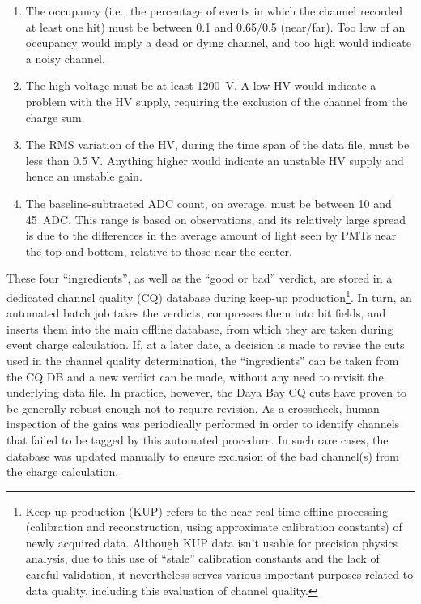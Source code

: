 \documentclass[../thesis.tex]{subfiles}
\begin{document}
\begin{enumerate}
\item The occupancy (i.e., the percentage of events in which the channel recorded at least one hit) must be between 0.1 and 0.65/0.5 (near/far). Too low of an occupancy would imply a dead or dying channel, and too high would indicate a noisy channel.
\item The high voltage must be at least 1200~V. A low HV would indicate a problem with the HV supply, requiring the exclusion of the channel from the charge sum.
\item The RMS variation of the HV, during the time span of the data file, must be less than 0.5 V. Anything higher would indicate an unstable HV supply and hence an unstable gain.
\item The baseline-subtracted ADC count, on average, must be between 10 and 45~ADC. This range is based on observations, and its relatively large spread is due to the differences in the average amount of light seen by PMTs near the top and bottom, relative to those near the center.
\end{enumerate}

These four ``ingredients'', as well as the ``good or bad'' verdict, are stored in a dedicated channel quality (CQ) database during keep-up production\footnote{Keep-up production (KUP) refers to the near-real-time offline processing (calibration and reconstruction, using approximate calibration constants) of newly acquired data. Although KUP data isn't usable for precision physics analysis, due to this use of ``stale'' calibration constants and the lack of careful validation, it nevertheless serves various important purposes related to data quality, including this evaluation of channel quality.}. In turn, an automated batch job takes the verdicts, compresses them into bit fields, and inserts them into the main offline database, from which they are taken during event charge calculation. If, at a later date, a decision is made to revise the cuts used in the channel quality determination, the ``ingredients'' can be taken from the CQ DB and a new verdict can be made, without any need to revisit the underlying data file. In practice, however, the Daya Bay CQ cuts have proven to be generally robust enough not to require revision. As a crosscheck, human inspection of the gains was periodically performed in order to identify channels that failed to be tagged by this automated procedure. In such rare cases, the database was updated manually to ensure exclusion of the bad channel(s) from the charge calculation.

\subfilebackmatter
\end{document}
